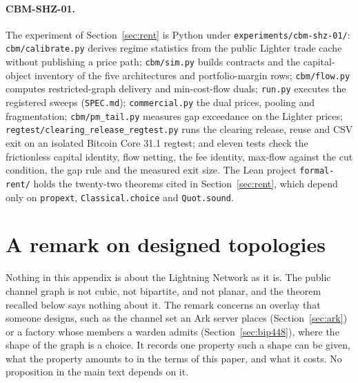 \documentclass[11pt]{article}
\theoremstyle{plain}
\theoremstyle{definition}
\theoremstyle{remark}
\begin{document}
\paragraph{CBM-SHZ-01.} The experiment of Section~\ref{sec:rent} is Python under \texttt{experiments/cbm-shz-01/}: \texttt{cbm/calibrate.py} derives regime statistics from the public Lighter trade cache without publishing a price path; \texttt{cbm/sim.py} builds contracts and the capital-object inventory of the five architectures and portfolio-margin rows; \texttt{cbm/flow.py} computes restricted-graph delivery and min-cost-flow duals; \texttt{run.py} executes the registered sweeps (\texttt{SPEC.md}); \texttt{commercial.py} the dual prices, pooling and fragmentation; \texttt{cbm/pm\_tail.py} measures gap exceedance on the Lighter prices; \texttt{regtest/clearing\_release\_regtest.py} runs the clearing release, reuse and CSV exit on an isolated Bitcoin Core 31.1 regtest; and eleven tests check the frictionless capital identity, flow netting, the fee identity, max-flow against the cut condition, the gap rule and the measured exit size. The Lean project \texttt{formal-rent/} holds the twenty-two theorems cited in Section~\ref{sec:rent}, which depend only on \texttt{propext}, \texttt{Classical.choice} and \texttt{Quot.sound}.

\section{A remark on designed topologies}
\label{app:topology}

Nothing in this appendix is about the Lightning Network as it is. The public channel graph is not cubic, not bipartite, and not planar, and the theorem recalled below says nothing about it. The remark concerns an overlay that someone designs, such as the channel set an Ark server places (Section~\ref{sec:ark}) or a factory whose members a warden admits (Section~\ref{sec:bip448}), where the shape of the graph is a choice. It records one property such a shape can be given, what the property amounts to in the terms of this paper, and what it costs. No proposition in the main text depends on it.
\end{document}
